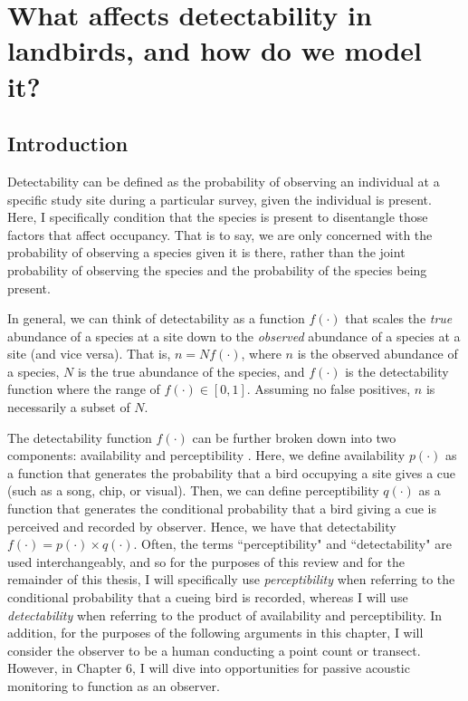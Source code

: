 \chapter{What affects detectability in landbirds, and how do we model it?}

\section{Introduction}

\par Detectability can be defined as the probability of observing an individual at a specific study site during a particular survey, given the individual is present.
Here, I specifically condition that the species is present to disentangle those factors that affect occupancy.
That is to say, we are only concerned with the probability of observing a species given it is there, rather than the joint probability of observing the species and the probability of the species being present.

\par In general, we can think of detectability as a function $f(\cdot)$ that scales the \textit{true} abundance of a species at a site down to the \textit{observed} abundance of a species at a site (and vice versa). 
That is, $n = Nf(\cdot)$, where $n$ is the observed abundance of a species, $N$ is the true abundance of the species, and $f(\cdot)$ is the detectability function where the range of $f(\cdot) \in [0,1]$.
Assuming no false positives, $n$ is necessarily a subset of $N$.

\par The detectability function $f(\cdot)$ can be further broken down into two components: availability and perceptibility \citep{marsh_correcting_1989}.
Here, we define availability $p(\cdot)$ as a function that generates the probability that a bird occupying a site gives a cue (such as a song, chip, or visual).
Then, we can define perceptibility $q(\cdot)$ as a function that generates the conditional probability that a bird giving a cue is perceived and recorded by observer.
Hence, we have that detectability $f(\cdot) = p(\cdot) \times q(\cdot)$.
Often, the terms ``perceptibility" and ``detectability" are used interchangeably, and so for the purposes of this review and for the remainder of this thesis, I will specifically use \textit{perceptibility} when referring to the conditional probability that a cueing bird is recorded, whereas I will use \textit{detectability} when referring to the product of availability and perceptibility.
In addition, for the purposes of the following arguments in this chapter, I will consider the observer to be a human conducting a point count or transect. However, in Chapter 6, I will dive into opportunities for passive acoustic monitoring to function as an observer.

